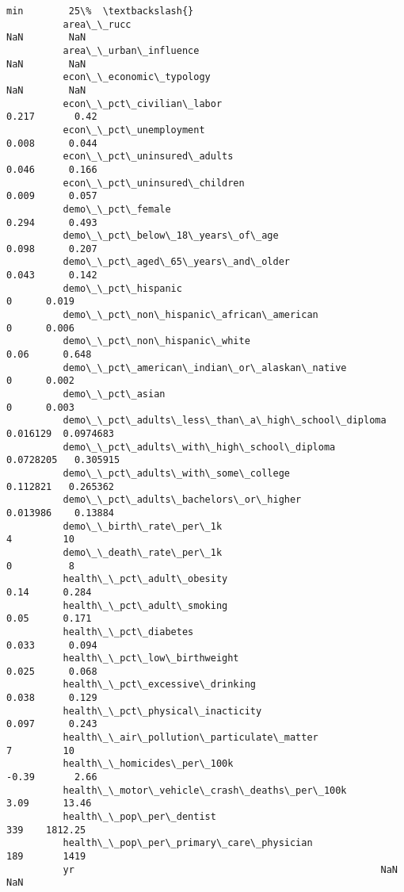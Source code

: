 \documentclass[11pt]{article}
\begin{document}
\begin{Verbatim}[commandchars=\\\{\}]
                                                                  min        25\%  \textbackslash{}
          area\_\_rucc                                              NaN        NaN   
          area\_\_urban\_influence                                   NaN        NaN   
          econ\_\_economic\_typology                                 NaN        NaN   
          econ\_\_pct\_civilian\_labor                              0.217       0.42   
          econ\_\_pct\_unemployment                                0.008      0.044   
          econ\_\_pct\_uninsured\_adults                            0.046      0.166   
          econ\_\_pct\_uninsured\_children                          0.009      0.057   
          demo\_\_pct\_female                                      0.294      0.493   
          demo\_\_pct\_below\_18\_years\_of\_age                       0.098      0.207   
          demo\_\_pct\_aged\_65\_years\_and\_older                     0.043      0.142   
          demo\_\_pct\_hispanic                                        0      0.019   
          demo\_\_pct\_non\_hispanic\_african\_american                   0      0.006   
          demo\_\_pct\_non\_hispanic\_white                           0.06      0.648   
          demo\_\_pct\_american\_indian\_or\_alaskan\_native               0      0.002   
          demo\_\_pct\_asian                                           0      0.003   
          demo\_\_pct\_adults\_less\_than\_a\_high\_school\_diploma   0.016129  0.0974683   
          demo\_\_pct\_adults\_with\_high\_school\_diploma         0.0728205   0.305915   
          demo\_\_pct\_adults\_with\_some\_college                 0.112821   0.265362   
          demo\_\_pct\_adults\_bachelors\_or\_higher               0.013986    0.13884   
          demo\_\_birth\_rate\_per\_1k                                   4         10   
          demo\_\_death\_rate\_per\_1k                                   0          8   
          health\_\_pct\_adult\_obesity                              0.14      0.284   
          health\_\_pct\_adult\_smoking                              0.05      0.171   
          health\_\_pct\_diabetes                                  0.033      0.094   
          health\_\_pct\_low\_birthweight                           0.025      0.068   
          health\_\_pct\_excessive\_drinking                        0.038      0.129   
          health\_\_pct\_physical\_inacticity                       0.097      0.243   
          health\_\_air\_pollution\_particulate\_matter                  7         10   
          health\_\_homicides\_per\_100k                            -0.39       2.66   
          health\_\_motor\_vehicle\_crash\_deaths\_per\_100k            3.09      13.46   
          health\_\_pop\_per\_dentist                                 339    1812.25   
          health\_\_pop\_per\_primary\_care\_physician                  189       1419   
          yr                                                      NaN        NaN   
          

\end{Verbatim}
\end{document}

